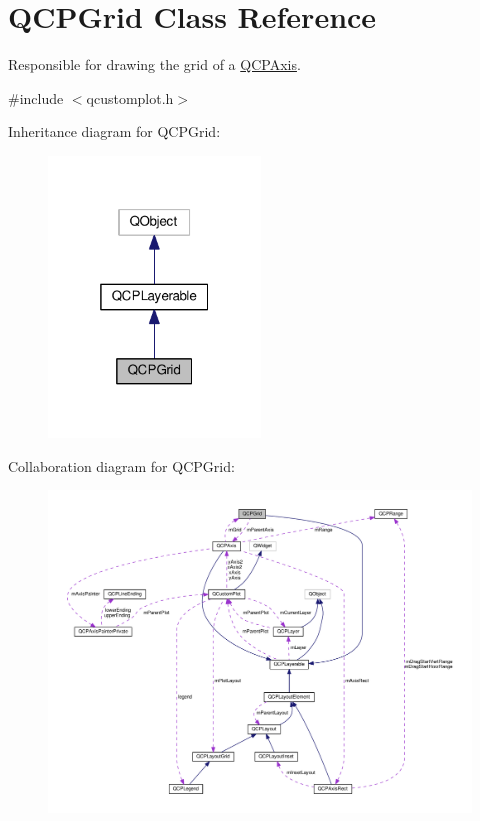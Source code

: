 \hypertarget{classQCPGrid}{}\section{Q\+C\+P\+Grid Class Reference}
\label{classQCPGrid}


Responsible for drawing the grid of a \hyperlink{classQCPAxis}{Q\+C\+P\+Axis}.  




{\ttfamily \#include $<$qcustomplot.\+h$>$}



Inheritance diagram for Q\+C\+P\+Grid\+:
\nopagebreak
\begin{figure}[H]
\begin{center}
\leavevmode
\includegraphics[width=160pt]{classQCPGrid__inherit__graph}
\end{center}
\end{figure}


Collaboration diagram for Q\+C\+P\+Grid\+:
\nopagebreak
\begin{figure}[H]
\begin{center}
\leavevmode
\includegraphics[width=350pt]{classQCPGrid__coll__graph}
\end{center}
\end{figure}
